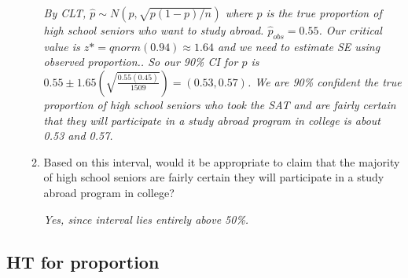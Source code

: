 \documentclass[12pt]{article}   	%
\newcommand{\soln}[2]{\textit{\textcolor{custom_red}{#2}}}{}
\begin{document}
\begin{enumerate}
\begin{enumerate}
    \soln{}{By CLT, $\hat{p} \sim N\left(p, \sqrt{p(1-p)/n}\right)$ where $p$ is the true proportion of high school seniors who want to study abroad. $\hat{p}_{obs} = 0.55$. Our critical value is $z* = qnorm(0.94) \approx 1.64$ and we need to estimate SE using observed proportion.. So our 90\% CI for $p$ is $0.55 \pm 1.65 \left(\sqrt{\frac{0.55(0.45)}{1509}} \right) = (0.53, 0.57)$. We are 90\% confident the true proportion of high school seniors who took the SAT and are fairly  certain that they will participate in a study abroad program in
college is about 0.53 and 0.57.}
  \item
    Based on this interval, would it be appropriate to claim that the
    majority of high school seniors are fairly certain they will
    participate in a study abroad program in college?
    
    \soln{}{Yes, since interval lies entirely above 50\%.}
  \end{enumerate}
\end{enumerate}

\subsection*{HT for proportion}
\end{document}
